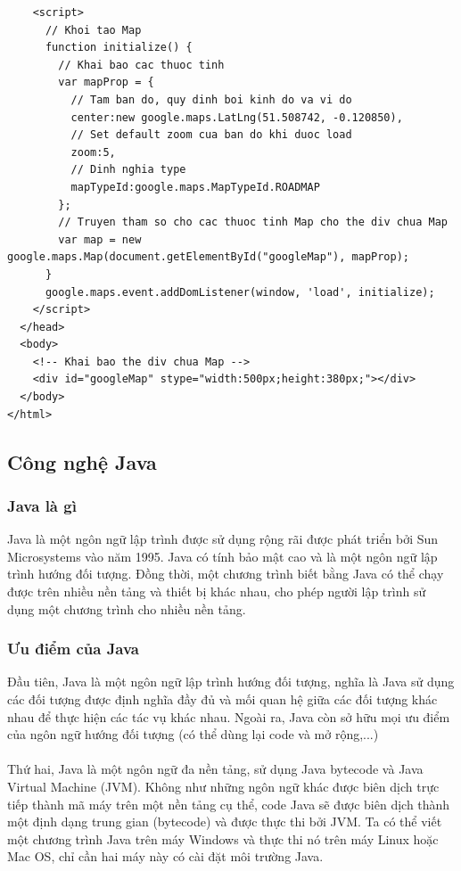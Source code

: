 \documentclass[a4paper]{article}
\begin{document}
\begin{itemize}
\begin{lstlisting}
    <script>
      // Khoi tao Map
      function initialize() {
        // Khai bao cac thuoc tinh
        var mapProp = {
          // Tam ban do, quy dinh boi kinh do va vi do
          center:new google.maps.LatLng(51.508742, -0.120850),
          // Set default zoom cua ban do khi duoc load
          zoom:5,
          // Dinh nghia type
          mapTypeId:google.maps.MapTypeId.ROADMAP
        };
        // Truyen tham so cho cac thuoc tinh Map cho the div chua Map
        var map = new google.maps.Map(document.getElementById("googleMap"), mapProp);
      }
      google.maps.event.addDomListener(window, 'load', initialize);
    </script>
  </head>
  <body>
    <!-- Khai bao the div chua Map -->
    <div id="googleMap" stype="width:500px;height:380px;"></div>
  </body>
</html>
\end{lstlisting}
\end{itemize}
\subsection{Công nghệ Java}
\subsubsection{Java là gì}
Java là một ngôn ngữ lập trình được sử dụng rộng rãi được phát triển bởi Sun Microsystems vào năm 1995. Java có tính bảo mật cao và là một ngôn ngữ lập trình hướng đối
tượng. Đồng thời, một chương trình biết bằng Java có thể chạy được trên nhiều nền tảng và thiết bị khác nhau, cho phép người lập trình sử dụng một chương trình cho nhiều
nền tảng.

\subsubsection{Ưu điểm của Java}
Đầu tiên, Java là một ngôn ngữ lập trình hướng đối tượng, nghĩa là Java sử dụng các đối tượng được định nghĩa đầy đủ và mối quan hệ giữa các đối tượng khác nhau để thực
hiện các tác vụ khác nhau. Ngoài ra, Java còn sở hữu mọi ưu điểm của ngôn ngữ hướng đối tượng (có thể dùng lại code và mở rộng,...)\\\\
Thứ hai, Java là một ngôn ngữ đa nền tảng, sử dụng Java bytecode và Java Virtual Machine (JVM). Không như những ngôn ngữ khác được biên dịch trực tiếp thành mã máy trên
một nền tảng cụ thể, code Java sẽ được biên dịch thành một định dạng trung gian (bytecode) và được thực thi bởi JVM. Ta có thể viết một chương trình Java trên máy Windows
và thực thi nó trên máy Linux hoặc Mac OS, chỉ cần hai máy này có cài đặt môi trường Java.
\end{document}
